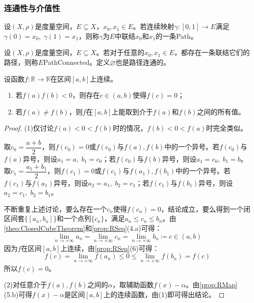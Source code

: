 \subsubsection{连通性与介值性}
\begin{definition}
	设$(X,\rho)$是度量空间，$E\subseteq X$，$x_0,x_1\in E$。若连续映射$\gamma:[0,1]\to E$满足$\gamma(0)=x_0,\;\gamma(1)=x_1$，则称$\gamma$为$E$中联结$x_0$和$x_1$的一条\gls{Path}。
\end{definition}
\begin{definition}
	设$(X,\rho)$是度量空间，$E\subseteq X$。若对于任意的$x_0,x_1\in E$，都存在一条联结它们的路径，则称$E$\gls{PathConnected}。定义$\varnothing$也是路径连通的。
\end{definition}
\begin{lemma}\label{lem:IntermediateValueR}
	设函数$f:\mathbb{R}\to\mathbb{R}$在区间$[a,b]$上连续。
	\begin{enumerate}
		\item 若$f(a)f(b)<0$，则存在$c\in(a,b)$使得$f(c)=0$；
		\item 若$f(a)\ne f(b)$，则$f$在$[a,b]$上能取到介于$f(a)$和$f(b)$之间的所有值。
	\end{enumerate}
\end{lemma}
\begin{proof}
	(1)仅讨论$f(a)<0<f(b)$时的情况，$f(b)<0<f(a)$时完全类似。\par
	取$c_0=\dfrac{a+b}{2}$，则$f(c_0)=0$或$f(c_0)$与$f(a),f(b)$中的一个异号。若$f(c_0)$与$f(a)$异号，则设$a_1=a,\;b_1=c_0$；若$f(c_0)$与$f(b)$异号，则设$a_1=c_0,\;b_1=b$。取$c_1=\dfrac{a_1+b_1}{2}$，则$f(c_1)=0$或$f(c_1)$与$f(a_1),f(b_1)$中的一个异号。若$f(c_1)$与$f(a_1)$异号，则设$a_2=a_1,\;b_2=c_1$；若$f(c_1)$与$f(b_1)$异号，则设$a_2=c_1,\;b_2=b_1$。\par
	不断重复上述讨论，要么存在一个$c_n$使得$f(c_n)=0$，结论成立，要么得到一个闭区间套$\{[a_n,b_n]\}$和一个点列$\{c_n\}$，满足$a_n\leqslant c_n\leqslant b_n$。由\cref{theo:ClosedCubeTheorem}和\cref{prop:RSeq}(4.a)可得：
	\begin{equation*}
		\lim_{n\to+\infty}a_n=\lim_{n\to+\infty}c_n=\lim_{n\to+\infty}b_n\coloneq c\in(a,b)
	\end{equation*}
	因为$f$在区间$[a,b]$上连续，由\cref{prop:RSeq}(6)可得：
	\begin{equation*}
		f(c)=\lim_{n\to+\infty}f(a_n)\leqslant0\leqslant\lim_{n\to+\infty}f(b_n)=f(c)
	\end{equation*}
	所以$f(c)=0$。\par
	(2)对任意介于$f(a),f(b)$之间的$\alpha$，取辅助函数$f(x)-\alpha$。由\cref{prop:RMap}(5.b)可得$f(x)-\alpha$是区间$[a,b]$上的连续函数，由(1)即可得出结论。
\end{proof}
